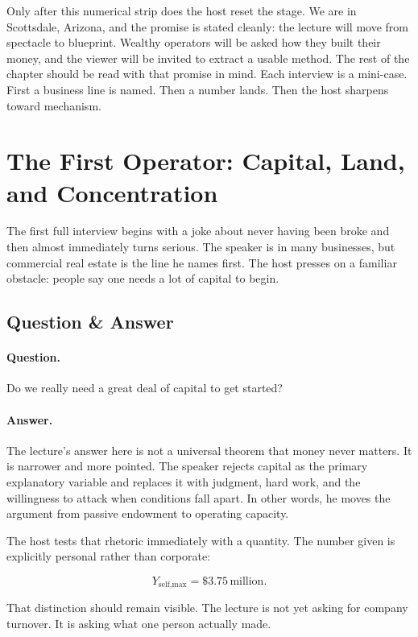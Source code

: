 Only after this numerical strip does the host reset the stage. We are in Scottsdale, Arizona, and the promise is stated cleanly: the lecture will move from spectacle to blueprint. Wealthy operators will be asked how they built their money, and the viewer will be invited to extract a usable method. The rest of the chapter should be read with that promise in mind. Each interview is a mini-case. First a business line is named. Then a number lands. Then the host sharpens toward mechanism.

\section{The First Operator: Capital, Land, and Concentration}

The first full interview begins with a joke about never having been broke and then almost immediately turns serious. The speaker is in many businesses, but commercial real estate is the line he names first. The host presses on a familiar obstacle: people say one needs a lot of capital to begin.

\subsection{Question \& Answer}

\paragraph{Question.} Do we really need a great deal of capital to get started?

\paragraph{Answer.} The lecture's answer here is not a universal theorem that money never matters. It is narrower and more pointed. The speaker rejects capital as the primary explanatory variable and replaces it with judgment, hard work, and the willingness to attack when conditions fall apart. In other words, he moves the argument from passive endowment to operating capacity.

The host tests that rhetoric immediately with a quantity. The number given is explicitly personal rather than corporate:

\begin{equation}
Y_{\text{self,max}}=\$3.75\,\text{million}.
\end{equation}

That distinction should remain visible. The lecture is not yet asking for company turnover. It is asking what one person actually made.

